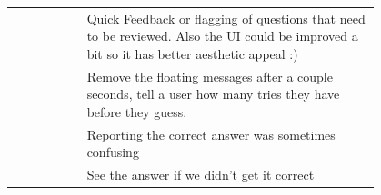 \begin{longtable}{r|p{0.8\linewidth}}
		& Quick Feedback or flagging of questions that need to be reviewed. Also the UI could be improved a bit so it has better aesthetic appeal :)                                                                                                                                                                                                                                                                                                                                                                                                                                                                                                                                                                                                       \\
		& Remove the floating messages after a couple seconds, tell a user how many tries they have before they guess.                                                                                                                                                                                                                                                                                                                                                                                                                                                                                                                                                                                                                                     \\
		& Reporting the correct answer was sometimes confusing                                                                                                                                                                                                                                                                                                                                                                                                                                                                                                                                                                                                                                                                                             \\
		& See the answer if we didn't get it correct                                                                                                                                                                                                                                                                                                                                                                                                                                                                                                                                                                                                                                                                                                       \\

\end{longtable}
